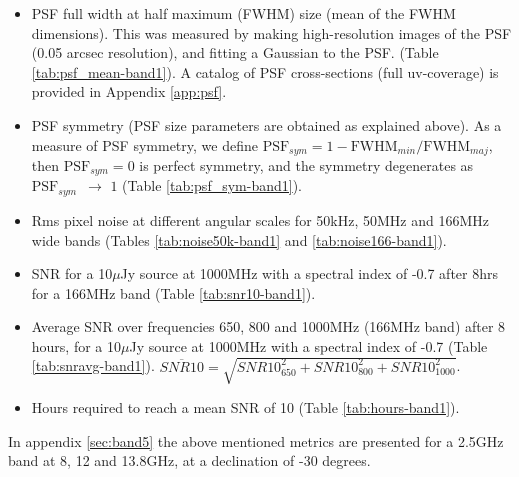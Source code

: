 \documentclass[sfheadings,a4paper,times,9pt,floats,floatfix]{article}
\begin{document}
\begin{itemize}
 \item PSF full width at half maximum (FWHM) size (mean of the FWHM dimensions). This was measured by making high-resolution
images of the PSF (0.05 arcsec resolution), and fitting a Gaussian to the PSF. (Table \ref{tab:psf_mean-band1}). A catalog of PSF
cross-sections (full uv-coverage) is provided in Appendix \ref{app:psf}.

 \item PSF symmetry (PSF size parameters are obtained as explained above). As a measure of PSF symmetry, we define 
$\text{PSF}_{sym}=1-\text{FWHM}_{min}/\text{FWHM}_{maj}$, then $\text{PSF}_{sym} = 0$ is perfect symmetry, and the symmetry
degenerates as $\text{PSF}_{sym}\,\,\, \rightarrow\,\,1$ (Table \ref{tab:psf_sym-band1}).

 \item Rms pixel noise at different angular scales for 50kHz, 50MHz and 166MHz wide bands (Tables \ref{tab:noise50k-band1} and
\ref{tab:noise166-band1}).
 
 \item SNR for a 10$\mu$Jy source at 1000MHz with a spectral index of -0.7 after 8hrs for a 166MHz band (Table
\ref{tab:snr10-band1}).
 
 \item Average SNR over frequencies 650, 800 and 1000MHz (166MHz band) after 8 hours, for a 10$\mu$Jy source at 1000MHz with a
spectral index of -0.7 (Table \ref{tab:snravg-band1}). {$\overline{SNR10}=\sqrt{SNR10_{650}^2 + SNR10_{800}^2 +
SNR10_{1000}^2}$}.

 \item Hours required to reach a mean SNR of 10 (Table \ref{tab:hours-band1}).
\end{itemize}
In appendix \ref{sec:band5} the above mentioned metrics are presented for a 2.5GHz band at 8, 12 and 13.8GHz, at a
declination of -30 degrees.









\newpage
\end{document}
